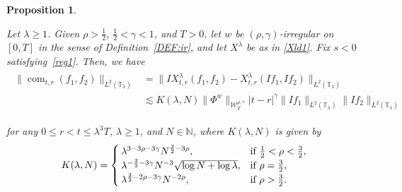 \documentclass[letterpaper, 11pt,  reqno]{amsart}
\newtheorem{proposition}[theorem]{Proposition}
\DeclareMathOperator{\com}{com}
\newcommand{\1}{\hspace{0.5mm}\text{I}\hspace{0.5mm}}
\newcommand{\noi}{\noindent}
\newcommand{\T}{\mathbb{T}}
\newcommand{\g}{\gamma}
\newcommand{\ld}{\lambda}
\newcommand{\les}{\lesssim}
\newcommand{\N}{\mathbb{N}}
\newcommand{\W}{\mathcal{W}}
\numberwithin{equation}{section}
\numberwithin{theorem}{section}
\begin{document}
\begin{proposition}
\label{PROP:com}

Let $\ld \ge 1$.
Given $\rho  >  \frac 12$,  $\frac 12 < \g < 1$,  and $T> 0$, 
let  $w$ be $(\rho,\g)$-irregular
on $[0, T]$ 
 in the sense of Definition~\ref{DEF:ir}, 
 and let $X^\ld$ be as in \eqref{Xld1}.
Fix  $s < 0$ satisfying~\eqref{reg1}.
Then, we have 
\begin{align}
\begin{aligned}
 \|\com_{t, r}(f_1, f_2) \|_{L^2(\T_\ld)}&  = \|IX^{\ld}_{t,r}( f _1, f _2) - X^{\ld}_{t,r} (I f _1,I f _2) \|_{L^2(\T_\ld)}\\
& \les
   K(\ld, N )\| \Phi^{w} \|_{\W_{T}^{\rho, \g}}
      |t-r|^{\g}
\| I  f _1 \|_{L^2(\T_\ld)}   \| I  f _2 \|_{L^2(\T_\ld)}  
\end{aligned}
\label{I5}
\end{align}





\noi
for any $0\leq r<t\leq \ld^3T$, $\ld \ge 1$, and $N \in \N$, 
where $ K(\ld, N )$ is given by 
\begin{align}
K(\ld, N )
= \begin{cases}
\ld^{3- 3\rho-3\g} N^{\frac 32 - 3\rho}, & \text{if $\frac 12 < \rho < \frac 32$}, \\
\ld^{- \frac 32 - 3\g} N^{-3} \sqrt{\log N + \log \ld}, & \text{if $\rho =  \frac 32$}, \\
\ld^{ \frac 32 - 2\rho - 3\g} N^{-2\rho}, & \text{if $ \rho >  \frac 32$}.
\end{cases}
\label{I5a}
\end{align}





\end{proposition}
\end{document}
